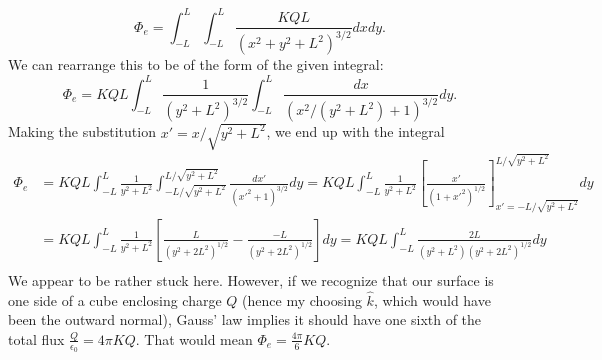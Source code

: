 \documentclass[]{article}
\begin{document}
\[
\Phi_{e} = \int_{-L}^{L}\int_{-L}^{L}\frac{KQL}{(x^{2}+y^{2}+L^{2})^{3/2}}dxdy.
\]
We can rearrange this to be of the form of the given integral:
\[
\Phi_{e} = KQL\int_{-L}^{L}\frac{1}{(y^{2}+L^{2})^{3/2}}\int_{-L}^{L}\frac{dx}{(x^{2}/(y^{2}+L^{2}) + 1)^{3/2}}dy.
\]
Making the substitution $ x' = x/\sqrt{y^{2}+L^{2}} $, we end up with the integral
\[
\begin{split}
	\Phi_{e} & = KQL\int_{-L}^{L}\frac{1}{y^{2}+L^{2}}\int_{-L/\sqrt{y^{2}+L^{2}}}^{L/\sqrt{y^{2}+L^{2}}}\frac{dx'}{(x'^{2} + 1)^{3/2}}dy = KQL\int_{-L}^{L}\frac{1}{y^{2}+L^{2}} \left[\frac{x'}{(1+x'^{2})^{1/2}}\right]_{x'=-L/\sqrt{y^{2}+L^{2}}}^{L/\sqrt{y^{2}+L^{2}}} dy \\
	& = KQL\int_{-L}^{L}\frac{1}{y^{2}+L^{2}} \left[\frac{L}{(y^{2}+2L^{2})^{1/2}} - \frac{-L}{(y^{2}+2L^{2})^{1/2}}\right] dy = KQL\int_{-L}^{L}\frac{2L}{(y^{2}+L^{2})(y^{2}+2L^{2})^{1/2}} dy \\
\end{split}
\]
We appear to be rather stuck here. However, if we recognize that our surface is one side of a cube enclosing charge $ Q $ (hence my choosing $ \hat{k} $, which would have been the outward normal), Gauss' law implies it should have one sixth of the total flux $ \frac{Q}{\epsilon_{0}} = 4\pi KQ $. That would mean $ \Phi_{e} = \frac{4\pi}{6}KQ $.
\end{document}
